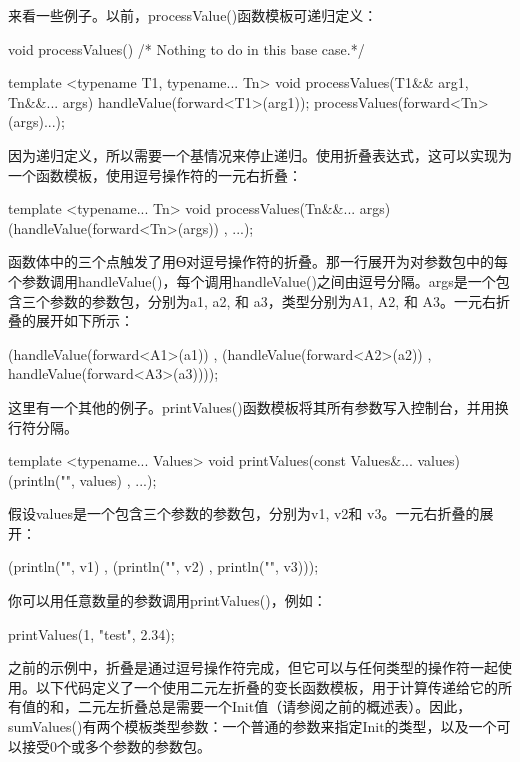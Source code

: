 来看一些例子。以前，processValue()函数模板可递归定义：

\begin{cpp}
void processValues() { /* Nothing to do in this base case.*/ }

template <typename T1, typename... Tn>
void processValues(T1&& arg1, Tn&&... args)
{
    handleValue(forward<T1>(arg1));
    processValues(forward<Tn>(args)...);
}
\end{cpp}

因为递归定义，所以需要一个基情况来停止递归。使用折叠表达式，这可以实现为一个函数模板，使用逗号操作符的一元右折叠：

\begin{cpp}
template <typename... Tn>
void processValues(Tn&&... args) { (handleValue(forward<Tn>(args)) , ...); }
\end{cpp}

函数体中的三个点触发了用Ѳ对逗号操作符的折叠。那一行展开为对参数包中的每个参数调用handleValue()，每个调用handleValue()之间由逗号分隔。args是一个包含三个参数的参数包，分别为a1, a2, 和 a3，类型分别为A1, A2, 和 A3。一元右折叠的展开如下所示：

\begin{cpp}
(handleValue(forward<A1>(a1)) ,
    (handleValue(forward<A2>(a2)) , handleValue(forward<A3>(a3))));
\end{cpp}

这里有一个其他的例子。printValues()函数模板将其所有参数写入控制台，并用换行符分隔。

\begin{cpp}
template <typename... Values>
void printValues(const Values&... values) { (println("{}", values) , ...); }
\end{cpp}

假设values是一个包含三个参数的参数包，分别为v1, v2和 v3。一元右折叠的展开：

\begin{cpp}
(println("{}", v1) , (println("{}", v2) , println("{}", v3)));
\end{cpp}

你可以用任意数量的参数调用printValues()，例如：

\begin{cpp}
printValues(1, "test", 2.34);
\end{cpp}

之前的示例中，折叠是通过逗号操作符完成，但它可以与任何类型的操作符一起使用。以下代码定义了一个使用二元左折叠的变长函数模板，用于计算传递给它的所有值的和，二元左折叠总是需要一个Init值（请参阅之前的概述表）。因此，sumValues()有两个模板类型参数：一个普通的参数来指定Init的类型，以及一个可以接受0个或多个参数的参数包。

